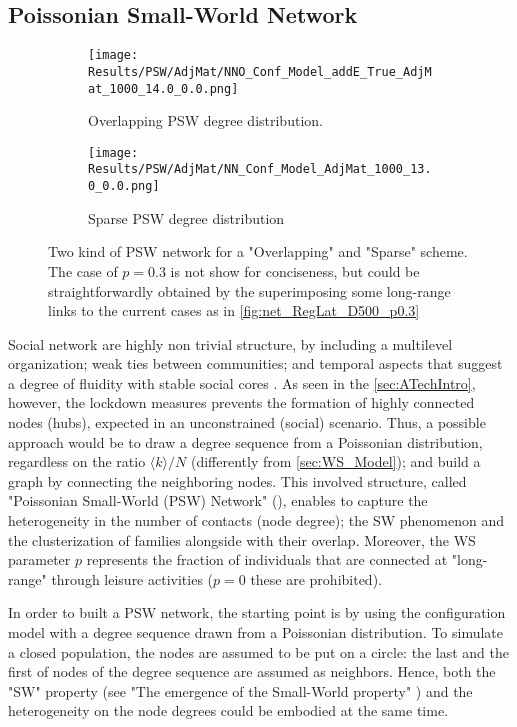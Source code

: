 \documentclass[a4paper,10pt]{book} %
\theoremstyle{definition}
\begin{document}
\subsection{Poissonian Small-World Network}
\label{sec:PSW_network}
\begin{figure}[ht]
    \begin{subfigure}{.45\linewidth}
        \texttt{[image: Results/PSW/AdjMat/NNO\_Conf\_Model\_addE\_True\_AdjMat\_1000\_14.0\_0.0.png]}
        \centering
        \caption{Overlapping PSW degree distribution. }
        \label{fig:netmod_O-PSW}
    \end{subfigure}
	\hfill
	\begin{subfigure}{.45\linewidth}
        \texttt{[image: Results/PSW/AdjMat/NN\_Conf\_Model\_AdjMat\_1000\_13.0\_0.0.png]}
        \centering
        \caption{Sparse PSW degree distribution}
        \label{fig:netmod_S-PSW}
    \end{subfigure}
	\caption{Two kind of PSW network for a "Overlapping" and "Sparse" scheme. The case of $p = 0.3$ is not show for conciseness, but could be straightforwardly obtained by the superimposing some long-range links to the current cases as in \autoref{fig:net_RegLat_D500_p0.3}}
\end{figure}
Social network are highly non trivial structure, by including a multilevel organization; weak ties between communities; and temporal aspects that suggest a degree of fluidity with stable social cores \cite{Thurner::NetBasedExpl}.
As seen in the \autoref{sec:ATechIntro}, however, the lockdown measures prevents the formation of highly connected nodes (hubs), expected in an unconstrained (social) scenario. Thus, a possible approach would be to draw a degree sequence from a Poissonian distribution, regardless on the ratio $\langle k \rangle / N$ (differently from \autoref{sec:WS_Model}); and build a graph by connecting the neighboring nodes.
This involved structure, called "Poissonian Small-World (PSW) Network" (\cite{Thurner::NetBasedExpl}), enables to capture the heterogeneity in the number of contacts (node degree); the SW phenomenon and the clusterization of families alongside with their overlap. Moreover, the WS parameter $p$ represents the fraction of individuals that are connected at "long-range" through leisure activities ($p = 0$ these are prohibited).

In order to built a PSW network, the starting point is by using the configuration model with a degree sequence drawn from a Poissonian distribution. To simulate a closed population, the nodes are assumed to be put on a circle: the last and the first of nodes of the degree sequence are assumed as neighbors. Hence, both the "SW" property (see "The emergence of the Small-World property" ) and the heterogeneity on the node degrees could be embodied at the same time. 
\end{document}

